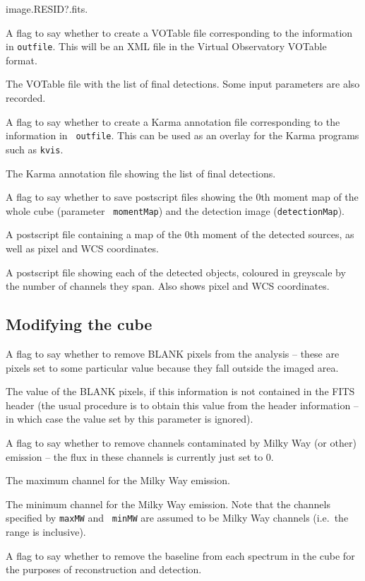 \documentclass[12pt,a4paper]{article}
\newcommand{\ie}{i.e.\ }
\newcommand{\entrylabel}[1]{\mbox{\textsf{\bf{#1:}}}\hfil}
\newenvironment{entry}
        {\begin{list}{}%
                {\renewcommand{\makelabel}{\entrylabel}%
                        \setlength{\labelwidth}{30mm}%
                        \setlength{\labelsep}{5pt}%
                        \setlength{\itemsep}{2pt}%
                        \setlength{\parsep}{2pt}%
                        \setlength{\leftmargin}{35mm}%
                }%
        }%
{\end{list}}
\begin{document}
\begin{entry}
{  image.RESID?.fits}.
\item[flagVOT {\tt [false]}] A flag to say whether to create a VOTable
  file corresponding to the information in {\tt outfile}. This will be
  an XML file in the Virtual Observatory VOTable format.
\item[votFile {\tt [./duchamp-Results.xml]}] The VOTable file with the
  list of final detections. Some input parameters are also recorded.
\item[flagKarma {\tt [false]}] A flag to say whether to create a Karma
  annotation file corresponding to the information in {\tt
  outfile}. This can be used as an overlay for the Karma programs such
  as {\tt kvis}.
\item[karmaFile {\tt [./duchamp-Results.ann]}] The Karma annotation
  file showing the list of final detections. 
\item[flagMaps {\tt [true]}] A flag to say whether to save postscript
  files showing the 0th moment map of the whole cube (parameter {\tt
  momentMap}) and the detection image ({\tt detectionMap}).
\item[momentMap {\tt [./latest-moment-map.ps]}] A postscript file
  containing a map of the 0th moment of the detected sources, as well
  as pixel and WCS coordinates.
\item[detectionMap {\tt [./latest-detection-map.ps]}] A postscript
  file showing each of the detected objects, coloured in greyscale by
  the number of channels they span. Also shows pixel and WCS
  coordinates.
\end{entry}

\subsection*{Modifying the cube}
\begin{entry}
\item[flagBlankPix {\tt [true]}] A flag to say whether to remove BLANK
  pixels from the analysis -- these are pixels set to some particular
  value because they fall outside the imaged area.
\item[blankPixValue {\tt [-8.00061]}] The value of the BLANK pixels,
  if this information is not contained in the FITS header (the usual
  procedure is to obtain this value from the header information -- in
  which case the value set by this parameter is ignored).
\item[flagMW {\tt [false]}] A flag to say whether to remove channels
  contaminated by Milky Way (or other) emission -- the flux in these
  channels is currently just set to 0.
\item[maxMW {\tt [112]}] The maximum channel for the Milky Way
  emission.
\item[minMW {\tt [75]}] The minimum channel for the Milky Way
  emission. Note that the channels specified by {\tt maxMW} and {\tt
  minMW} are assumed to be Milky Way channels (\ie the range is
  inclusive).
\item[flagBaseline {\tt [false]}] A flag to say whether to remove the
  baseline from each spectrum in the cube for the purposes of
  reconstruction and detection.
\end{entry}
\end{document}
